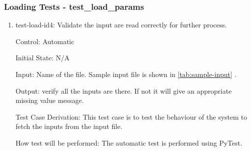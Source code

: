 \documentclass[12pt, titlepage]{article}
\begin{document}
\subsubsection{Loading Tests - test\_load\_params} 
\label{load_input_test}
\begin{enumerate}
    \item {test-load-id4: Validate the input are read correctly for further process. \\}

    Control: Automatic
    
    Initial State: N/A
    
    Input: Name of the file. Sample input file is shown in \autoref{tab:sample-input} .  
    
    Output: verify all the inputs are there. If not it will give an appropriate missing value message. 
    
    Test Case Derivation: This test case is to test the behaviour of the system to fetch the inputs from the input file. 
    
    How test will be performed: The automatic test is performed using PyTest.
\end{enumerate}
\end{document}
